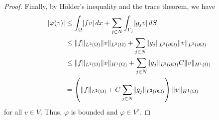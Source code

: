 \documentclass[english, 12pt, a4paper, sci, utf8, a-2b, online]{aaltothesis}
\theoremstyle{definition}
\theoremstyle{plain}
\DeclarePairedDelimiter\abs{\lvert}{\rvert}
\DeclarePairedDelimiter\norm{\lVert}{\rVert}
\newcommand*\diff{\mathop{}\!d}
\numberwithin{equation}{section}
\begin{document}
\begin{proof}
    Finally, by Hölder's inequality and the trace theorem, we have
    \begin{align*}
        \abs{\varphi(v)}
        &\leq \int_{\Omega} \abs{fv} \diff x
            + \sum_{j \in N} \int_{\Gamma_j} \abs{g_j v} \diff S \\
        &\leq \norm{f}_{L^2(\Omega)} \norm{v}_{L^2(\Omega)}
            + \sum_{j \in N} \norm{g_j}_{L^2(\partial \Omega)} \norm{v}_{L^2(\partial \Omega)} \\
        &\leq \norm{f}_{L^2(\Omega)} \norm{v}_{H^1(\Omega)}
            + \sum_{j \in N} \norm{g_j}_{L^2(\partial \Omega)} C \norm{v}_{H^1(\Omega)} \\
        &= \left( \norm{f}_{L^2(\Omega)} + C \sum_{j \in N} \norm{g_j}_{L^2(\partial \Omega)} 
            \right) \norm{v}_{H^1(\Omega)}
    \end{align*}
    for all $v \in V$. Thus, $\varphi$ is bounded and $\varphi \in V'$.
\end{proof}
\end{document}
